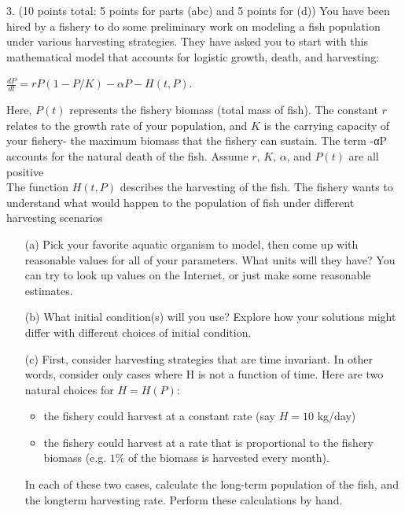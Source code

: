 \documentclass[12pt,letterpaper]{hmcpset}
\begin{document}
\begin{problem}
3. (10 points total: 5 points for parts (abc) and 5 points for (d)) You have been hired by a
fishery to do some preliminary work on modeling a fish population under various harvesting
strategies. They have asked you to start with this mathematical model that accounts for
logistic growth, death, and harvesting:\\

\begin{center}
    $\frac{dP}{dt}= rP(1 - P/K)-\alpha P-H(t, P)$.
\end{center}

Here, $P(t)$ represents the fishery biomass (total mass of fish). The constant $r$ relates to
the growth rate of your population, and $K$ is the carrying capacity of your fishery- the
maximum biomass that the fishery can sustain. The term -αP accounts for the natural
death of the fish. Assume $r$, $K$, $\alpha$, and $P(t)$ are all positive\\

The function $H(t, P)$ describes the harvesting of the fish. The fishery wants to understand
what would happen to the population of fish under different harvesting scenarios

\begin{enumerate}
    \item[(a)]Pick your favorite aquatic organism to model, then come up with reasonable values for
all of your parameters. What units will they have? You can try to look up values on
the Internet, or just make some reasonable estimates.
    \item[(b)] What initial condition(s) will you use? Explore how your solutions might differ with
different choices of initial condition.
    \item[(c)] First, consider harvesting strategies that are time invariant. In other words, consider
only cases where H is not a function of time. Here are two natural choices for
$H = H(P)$:

\begin{itemize}
  \item the fishery could harvest at a constant rate (say $H = 10$ kg/day)
  \item the fishery could harvest at a rate that is proportional to the fishery biomass
(e.g. $1\%$ of the biomass is harvested every month).
\end{itemize}
In each of these two cases, calculate the long-term population of the fish, and the longterm
harvesting rate. Perform these calculations by hand.


\end{enumerate}
\end{problem}
\end{document}
